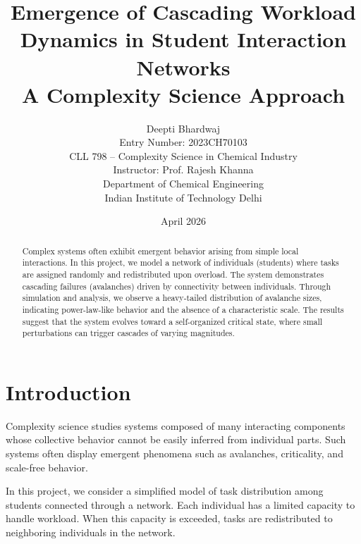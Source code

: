 \documentclass[12pt]{article}
\begin{document}
\title{\textbf{\Large Emergence of Cascading Workload Dynamics in Student Interaction Networks\\
\vspace{0.2cm}
A Complexity Science Approach}}

\author{
 Deepti Bhardwaj \\
Entry Number: 2023CH70103 \\
\vspace{0.3cm}
CLL 798 -- Complexity Science in Chemical Industry \\
Instructor: Prof. Rajesh Khanna \\
Department of Chemical Engineering \\
Indian Institute of Technology Delhi
}

\date{\normalsize April 2026}
\maketitle

\begin{abstract}
\noindent
\normalsize
Complex systems often exhibit emergent behavior arising from simple local interactions. In this project, we model a network of individuals (students) where tasks are assigned randomly and redistributed upon overload. The system demonstrates cascading failures (avalanches) driven by connectivity between individuals. Through simulation and analysis, we observe a heavy-tailed distribution of avalanche sizes, indicating power-law-like behavior and the absence of a characteristic scale. The results suggest that the system evolves toward a self-organized critical state, where small perturbations can trigger cascades of varying magnitudes.
\end{abstract}


\newpage
\section{Introduction}
Complexity science studies systems composed of many interacting components whose collective behavior cannot be easily inferred from individual parts. Such systems often display emergent phenomena such as avalanches, criticality, and scale-free behavior.

In this project, we consider a simplified model of task distribution among students connected through a network. Each individual has a limited capacity to handle workload. When this capacity is exceeded, tasks are redistributed to neighboring individuals in the network. 
\end{document}
